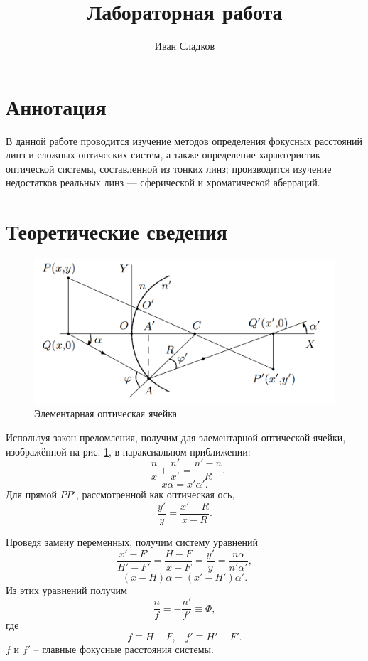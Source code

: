 \documentclass[a4paper]{article}
\title{Лабораторная работа \labnum \space \labname} %
\author{Иван Сладков}
\newcommand{\picref}[1]{рис. \ref{#1}}
\begin{document}
\maketitle
\thispagestyle{empty}
\section{Аннотация}
В данной работе проводится изучение методов определения фокусных расстояний линз и сложных оптических систем, а также определение характеристик оптической системы, составленной из тонких линз; производится изучение недостатков реальных линз — сферической и хроматической аберраций.


\section{Теоретические сведения}

\begin{figure}[tbp]
	\centering
	\includegraphics[width=0.8\linewidth]{Screenshot_1}
	\caption{Элементарная оптическая ячейка}
	\label{2}
\end{figure}


Используя закон преломления, получим для элементарной оптической ячейки, изображённой на \picref{2}, в параксиальном приближении:
\begin{equation}\label{опт-ячейка}
	-\frac{n}{x}+\frac{n'}{x'} = \frac{n'-n}{R},
\end{equation}
\begin{equation}
	x \alpha = x' \alpha'.
\end{equation}
Для прямой $ P P' $, рассмотренной как оптическая ось, 
\begin{equation}\label{PP}
	\frac{y'}{y} = \frac{x' - R}{x - R}.
\end{equation}

Проведя замену переменных, получим систему уравнений
\begin{equation}\label{grid}
	\frac{x' - F'}{H' - F'}= \frac{H-F}{x- F} = \frac{y'}{y} = \frac{n \alpha}{n' \alpha'},
\end{equation}
\begin{equation}\label{grid1}
	(x-H)\alpha= (x' - H')\alpha'.
\end{equation}
Из этих уравнений получим
\begin{equation}\label{Ф}
	\frac{n}{f} = -\frac{n'}{f'} \equiv \Phi,
\end{equation}
где
\begin{equation}\label{focus-len}
	f\equiv H - F, \;\;\; f'\equiv H' - F'.
\end{equation}
$ f $ и $ f' $ -- главные фокусные расстояния системы.
\end{document}

